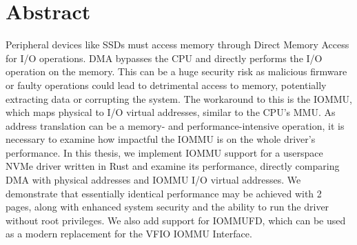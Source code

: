\chapter{Abstract}

Peripheral devices like SSDs must access memory through Direct Memory Access for I/O operations. DMA bypasses the CPU and directly performs the I/O operation on the memory. This can be a huge security risk as malicious firmware or faulty operations could lead to detrimental access to memory, potentially extracting data or corrupting the system. The workaround to this is the IOMMU, which maps physical to I/O virtual addresses, similar to the CPU's MMU. As address translation can be a memory- and performance-intensive operation, it is necessary to examine how impactful the IOMMU is on the whole driver's performance.
In this thesis, we implement IOMMU support for a userspace NVMe driver written in Rust and examine its performance, directly comparing DMA with physical addresses and IOMMU I/O virtual addresses. We demonstrate that essentially identical performance may be achieved with \qty{2}{\mebi\byte} pages, along with enhanced system security and the ability to run the driver without root privileges. We also add support for IOMMUFD, which can be used as a modern replacement for the VFIO IOMMU Interface.